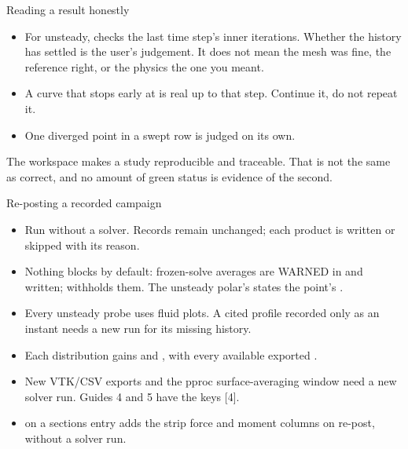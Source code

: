 \begin{frame}{Reading a result honestly}
\begin{itemize}
  \item For unsteady,  checks the last time step's inner
        iterations. Whether the history has settled is the user's judgement.
        It does not mean the mesh was
        fine, the reference right, or the physics the one you meant.
  \item A curve that stops early at  is real up to that
        step. Continue it, do not repeat it.
  \item One diverged point in a swept row is judged on its own.
\end{itemize}
\begin{ftslimit}
The workspace makes a study reproducible and traceable. That is not the same
as correct, and no amount of green status is evidence of the second.
\end{ftslimit}
\end{frame}

\begin{frame}{Re-posting a recorded campaign}
\begin{itemize}\small
  \item Run  without a solver.
        Records remain unchanged; each product is written or skipped with its reason.
  \item Nothing blocks by default: frozen-solve averages are
        WARNED in  and written;  withholds
        them. The unsteady polar's  states the point's .
  \item Every unsteady probe uses fluid plots. A cited profile recorded only
        as an instant needs a new run for its missing history.
  \item Each distribution gains  and
        , with every available exported .
  \item New VTK/CSV exports and the pproc surface-averaging window need a new
        solver run. Guides 4 and 5 have the keys [4].
  \item {} on a sections entry adds the
        strip force and moment columns on re-post, without a solver run.
\end{itemize}
\end{frame}
